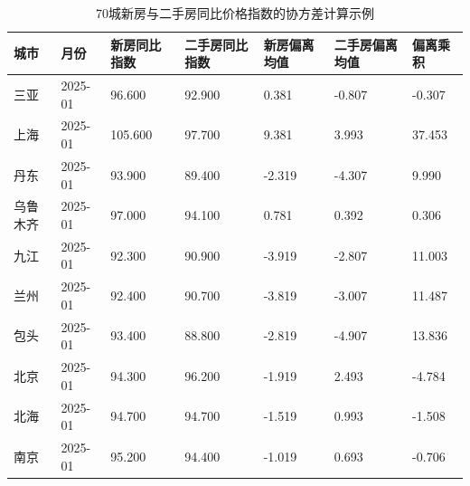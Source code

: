 \begin{table}[htbp]
\centering
\caption{70城新房与二手房同比价格指数的协方差计算示例}
\label{tab:ch2-70city-covariance}
\begin{tabular}{lllllll}
\hline
城市 & 月份 & 新房同比指数 & 二手房同比指数 & 新房偏离均值 & 二手房偏离均值 & 偏离乘积
\\
\hline
三亚 & 2025-01 & 96.600 & 92.900 & 0.381 & -0.807 & -0.307
\\
上海 & 2025-01 & 105.600 & 97.700 & 9.381 & 3.993 & 37.453
\\
丹东 & 2025-01 & 93.900 & 89.400 & -2.319 & -4.307 & 9.990
\\
乌鲁木齐 & 2025-01 & 97.000 & 94.100 & 0.781 & 0.392 & 0.306
\\
九江 & 2025-01 & 92.300 & 90.900 & -3.919 & -2.807 & 11.003
\\
兰州 & 2025-01 & 92.400 & 90.700 & -3.819 & -3.007 & 11.487
\\
包头 & 2025-01 & 93.400 & 88.800 & -2.819 & -4.907 & 13.836
\\
北京 & 2025-01 & 94.300 & 96.200 & -1.919 & 2.493 & -4.784
\\
北海 & 2025-01 & 94.700 & 94.700 & -1.519 & 0.993 & -1.508
\\
南京 & 2025-01 & 95.200 & 94.400 & -1.019 & 0.693 & -0.706
\\
\hline
\end{tabular}
\end{table}
